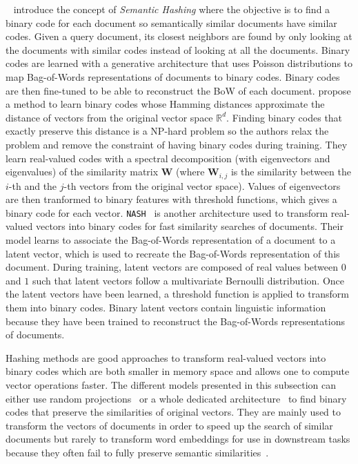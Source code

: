     \citeauthor{salakhutdinov2007semantic}~\citep{salakhutdinov2007semantic}
    introduce the concept of \textit{Semantic Hashing} where the objective is to
    find a binary code for each document so semantically similar documents have
    similar codes. Given a query document, its closest neighbors are found by
    only looking at the documents with similar codes instead of looking at all
    the documents. Binary codes are learned with a generative architecture that
    uses Poisson distributions to map Bag-of-Words representations of documents
    to binary codes. Binary codes are then fine-tuned to be able to reconstruct
    the BoW of each document. \citeauthor{weiss2009spectral}
    \citep{weiss2009spectral} propose a method to learn binary codes whose
    Hamming distances approximate the distance of vectors from the original
    vector space $\mathbb{R}^d$. Finding binary codes that exactly preserve this
    distance is a NP-hard problem so the authors relax the problem and remove
    the constraint of having binary codes during training. They learn real-valued
    codes with a spectral decomposition (with eigenvectors and eigenvalues) of
    the similarity matrix $\mathbf{W}$ (where $\mathbf{W}_{i, j}$ is the
    similarity between the $i$-th and the $j$-th vectors from the original
    vector space). Values of eigenvectors are then tranformed to binary features
    with threshold functions, which gives a binary code for each vector.
    \texttt{NASH}~\citep{shen2018NASH} is another architecture used to transform
    real-valued vectors into binary codes for fast similarity searches of
    documents. Their model learns to associate the Bag-of-Words representation
    of a document to a latent vector, which is used to recreate the Bag-of-Words
    representation of this document. During training, latent vectors are
    composed of real values between $0$ and $1$ such that latent vectors follow
    a multivariate Bernoulli distribution. Once the latent vectors have been
    learned, a threshold function is applied to transform them into binary
    codes. Binary latent vectors contain linguistic information because they
    have been trained to reconstruct the Bag-of-Words representations of
    documents.\medskip

    Hashing methods are good approaches to transform real-valued vectors into
    binary codes which are both smaller in memory space and allows one to
    compute vector operations faster. The different models presented in this
    subsection can either use random projections~\citep{charikar2002similarity,
    datar2004locality} or a whole dedicated architecture~\citep{shen2018NASH} to
    find binary codes that preserve the similarities of original vectors. They
    are mainly used to transform the vectors of documents in order to speed up the
    search of similar documents but rarely to transform word embeddings for use
    in downstream tasks because they often fail to fully preserve semantic
    similarities~\citep{Xu2015convolutional}.

